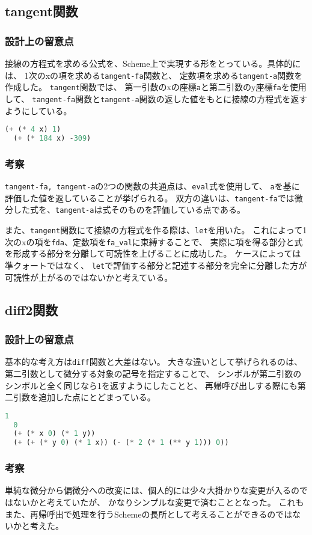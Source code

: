 \documentclass[11pt,a4paper, uplatex]{jsarticle}
\begin{document}
\subsection{tangent関数}
\subsubsection{設計上の留意点}
接線の方程式を求める公式を、Scheme上で実現する形をとっている。具体的には、
1次のxの項を求める\texttt{tangent-fa}関数と、
定数項を求める\texttt{tangent-a}関数を作成した。
\texttt{tangent}関数では、
第一引数のxの座標\texttt{a}と第二引数のy座標\texttt{fa}を使用して、
\texttt{tangent-fa}関数と\texttt{tangent-a}関数の返した値をもとに接線の方程式を返すようにしている。
\begin{lstlisting}[language=lisp, breaklines=true, caption=\texttt{tangent}関数実行例()]
  (+ (* 4 x) 1)
  (+ (* 184 x) -309)
\end{lstlisting}
\subsubsection{考察}
\texttt{tangent-fa, tangent-a}の2つの関数の共通点は、\texttt{eval}式を使用して、
\texttt{a}を基に評価した値を返していることが挙げられる。
双方の違いは、\texttt{tangent-fa}では微分した式を、\texttt{tangent-a}は式そのものを評価している点である。

また、\texttt{tangent}関数にて接線の方程式を作る際は、\texttt{let}を用いた。
これによって1次のxの項を\texttt{fda}、定数項を\texttt{fa_val}に束縛することで、
実際に項を得る部分と式を形成する部分を分離して可読性を上げることに成功した。
ケースによっては準クォートではなく、
\texttt{let}で評価する部分と記述する部分を完全に分離した方が可読性が上がるのではないかと考えている。

\subsection{diff2関数}
\subsubsection{設計上の留意点}
基本的な考え方は\texttt{diff}関数と大差はない。
大きな違いとして挙げられるのは、第二引数として微分する対象の記号を指定することで、
シンボルが第二引数のシンボルと全く同じなら1を返すようにしたことと、
再帰呼び出しする際にも第二引数を追加した点にとどまっている。
\begin{lstlisting}[language=lisp, breaklines=true, caption=\texttt{diff2}関数実行例()]
  1
  0
  (+ (* x 0) (* 1 y))
  (+ (+ (* y 0) (* 1 x)) (- (* 2 (* 1 (** y 1))) 0))
\end{lstlisting}
\subsubsection{考察}
単純な微分から偏微分への改変には、個人的には少々大掛かりな変更が入るのではないかと考えていたが、
かなりシンプルな変更で済むこととなった。
これもまた、再帰呼出で処理を行うSchemeの長所として考えることができるのではないかと考えた。
\end{document}
